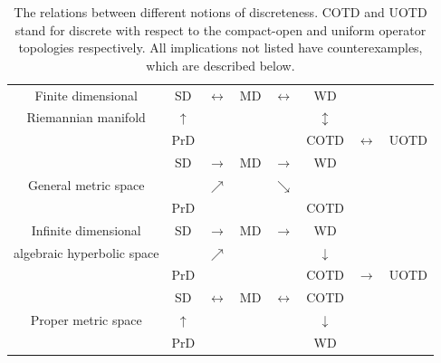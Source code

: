\begin{table}[h!]
\begin{tabular}{ | c | c c c c c c c | }
 \hline
 Finite dimensional			& SD & $\leftrightarrow$ & MD & $\leftrightarrow$ & WD && \\
 Riemannian manifold 	& $\uparrow$ & & & & $\updownarrow$ && \\
	 			& PrD & & & & COTD & $\leftrightarrow$ & UOTD\\
 \hline
	 		& SD & $\rightarrow$ & MD & $\rightarrow$ & WD && \\
 General metric space		& & $\nearrow$ & & $\searrow$ & && \\
				& PrD & & & & COTD && \\
 \hline
 Infinite dimensional				& SD & $\rightarrow$ & MD & $\rightarrow$ & WD && \\
 algebraic hyperbolic space 	& & $\nearrow$ & & & $\downarrow$ && \\
			& PrD & & & & COTD & $\rightarrow$ & UOTD \\
 \hline
	 		& SD & $\leftrightarrow$ & MD & $\leftrightarrow$ & COTD && \\
 Proper metric  space 		& $\uparrow$ & & & & $\downarrow$ &&\\
			& PrD & & & & WD && \\
 \hline
\end{tabular}
\vskip0.12cm
\caption{The relations between different notions of discreteness. COTD and UOTD stand for discrete with respect to the compact-open and uniform operator topologies respectively. All implications not listed have counterexamples, which are described below.}
\label{figurediscretenesscopy}
\end{table}


